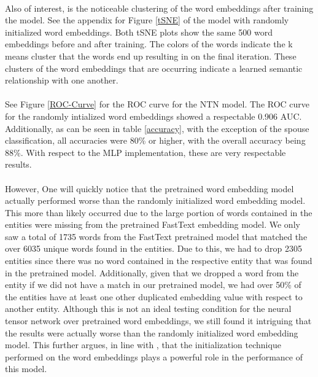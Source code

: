 \documentclass[11.5pt]{article}
\newcounter{Figure}
\begin{document}
\paragraph{} Also of interest, is the noticeable clustering of the word embeddings after training the model. See the appendix for Figure \ref{tSNE} of the model with randomly initialized word embeddings. Both tSNE plots show the same 500 word embeddings before and after training. The colors of the words indicate the k means cluster that the words end up resulting in on the final iteration. These clusters of the word embeddings that are occurring indicate a learned semantic relationship with one another.

\paragraph{}  See Figure \ref{ROC-Curve} for the ROC curve for the NTN model. The ROC curve for the randomly intialized word embeddings showed a respectable 0.906 AUC. Additionally, as can be seen in table \ref{accuracy}, with the exception of the spouse classification, all accuracies were 80\% or higher, with the overall accuracy being 88\%. With respect to the MLP implementation, these are very respectable results. 

\paragraph{}  However, One will quickly notice that the pretrained word embedding model actually performed worse than the randomly initialized word embedding model. This more than likely occurred due to the large portion of words contained in the entities were missing from the pretrained FastText embedding model. We only saw a total of 1735 words from the FastText pretrained model that matched the over 6035 unique words found in the entities. Due to this, we had to drop 2305 entities since there was no word contained in the respective entity that was found in the pretrained model. Additionally, given that we dropped a word from the entity if we did not have a match in our pretrained model, we had over 50\% of the entities have at least one other duplicated embedding value with respect to another entity. Although this is not an ideal testing condition for the neural tensor network over pretrained word embeddings, we still found it intriguing that the results were actually worse than the randomly initialized word embedding model. This further argues, in line with \cite{socher2013reasoning}, that the initialization technique performed on the word embeddings plays a powerful role in the performance of this model.
\end{document}
